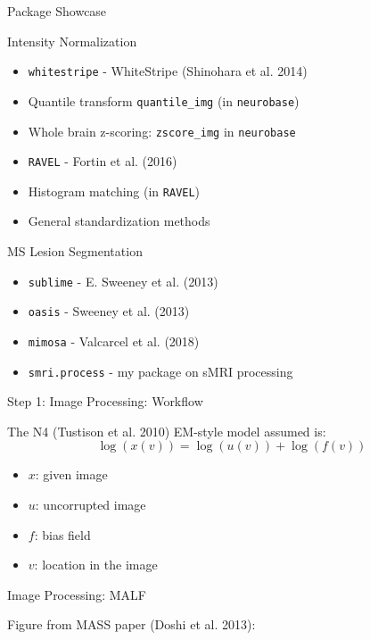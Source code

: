 \documentclass[ignorenonframetext,]{beamer}
\providecommand{\tightlist}{%
  \setlength{\itemsep}{0pt}\setlength{\parskip}{0pt}}
\begin{document}
\begin{frame}[fragile]{Package Showcase}
\begin{block}{Intensity Normalization}
\begin{itemize}
\tightlist
\item
  \texttt{whitestripe} - WhiteStripe (Shinohara et al. 2014)
\item
  Quantile transform \texttt{quantile\_img} (in \texttt{neurobase})
\item
  Whole brain z-scoring: \texttt{zscore\_img} in \texttt{neurobase}
\item
  \texttt{RAVEL} - Fortin et al. (2016)
\item
  Histogram matching (in \texttt{RAVEL})
\item
  General standardization methods
\end{itemize}

\end{block}

\begin{block}{MS Lesion Segmentation}

\begin{itemize}
\tightlist
\item
  \texttt{sublime} - E. Sweeney et al. (2013)
\item
  \texttt{oasis} - Sweeney et al. (2013)
\item
  \texttt{mimosa} - Valcarcel et al. (2018)
\item
  \texttt{smri.process} - my package on sMRI processing
\end{itemize}

\end{block}

\begin{block}{Step 1: Image Processing: Workflow}

The N4 (Tustison et al. 2010) EM-style model assumed is: \[
\log(x(v)) = \log(u(v)) + \log( f(v) )
\]

\begin{itemize}
\tightlist
\item
  \(x\): given image
\item
  \(u\): uncorrupted image
\item
  \(f\): bias field
\item
  \(v\): location in the image
\end{itemize}

\end{block}

\begin{block}{Image Processing: MALF}

\leavevmode\hypertarget{left_col}{}%
Figure from MASS paper (Doshi et al. 2013):


\end{block}
\end{frame}
\end{document}
